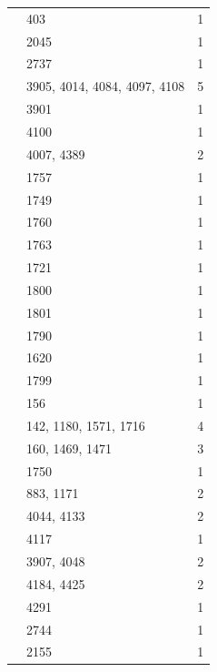 \begin{longtable}{@{}p{}p{}p{}@{}}
\cite[Lemma~3.3]{KoshitaniSpath2016} & 403 & 1 \\
\cite[Theorem~1.1]{KoshitaniSpath2016} & 2045 & 1 \\
\cite[Theorem~1.3]{KoshitaniSpath2016} & 2737 & 1 \\
\cite[(6.2.11)]{Letellier2005} & 3905, 4014, 4084, 4097, 4108 & 5 \\
\cite[Assumption~5.0.14]{Letellier2005} & 3901 & 1 \\
\cite[Remark~4.4.6]{Letellier2005} & 4100 & 1 \\
\cite[p.~115]{Letellier2005} & 4007, 4389 & 2 \\
\cite[Lemmas~5.1 and~5.3]{Li2021} & 1757 & 1 \\
\cite[Lemma~3.13]{Li2021} & 1749 & 1 \\
\cite[Lemma~5.1]{Li2021} & 1760 & 1 \\
\cite[Lemma~5.3]{Li2021} & 1763 & 1 \\
\cite[Lemma~5.4]{Li2021} & 1721 & 1 \\
\cite[Lemma~5.5]{Li2021} & 1800 & 1 \\
\cite[Lemma~5.5(1)--(2)]{Li2021} & 1801 & 1 \\
\cite[Remark~2.2(1)]{Li2021} & 1790 & 1 \\
\cite[Remark~2.5]{Li2021} & 1620 & 1 \\
\cite[Section~2.C]{Li2021} & 1799 & 1 \\
\cite[Section~6]{Li2021} & 156 & 1 \\
\cite[Theorem~2]{Li2021} & 142, 1180, 1571, 1716 & 4 \\
\cite[Theorem~3]{Li2021} & 160, 1469, 1471 & 3 \\
\cite[Theorem~4.13 and Remarks~4.7--4.8]{Li2021} & 1750 & 1 \\
\cite[Theorem~1.1]{LiLi2019} & 883, 1171 & 2 \\
\cite[(8.4)(a)]{Lusztig1992Support} & 4044, 4133 & 2 \\
\cite[Proposition~7.2]{Lusztig1992Support} & 4117 & 1 \\
\cite[Proposition~8.5 and Corollary~8.6]{Lusztig1992Support} & 3907, 4048 & 2 \\
\cite[Theorem~10.7]{Lusztig1992Support} & 4184, 4425 & 2 \\
\cite[Theorem~11.2(iv)]{Lusztig1992Support} & 4291 & 1 \\
\cite[Section~5.5]{Macgregor2022} & 2744 & 1 \\
\cite[Proposition~12.14]{MalleTesterman2011} & 2155 & 1 \\

\end{longtable}
